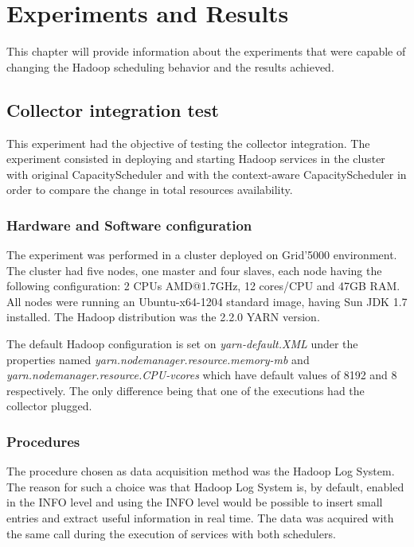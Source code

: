 \chapter{Experiments and Results}
\label{chap:Experiments and Results}
This chapter will provide information about the experiments that were capable of changing the Hadoop scheduling behavior and the results achieved.

\section{Collector integration test}
This experiment had the objective of testing the collector integration. The experiment consisted in deploying and starting Hadoop services in the cluster with original CapacityScheduler and with the context-aware CapacityScheduler in order to compare the change in total resources availability.

\subsection{Hardware and Software configuration}
The experiment was performed in a cluster deployed on Grid'5000 environment. The cluster had five nodes, one master and four slaves, each node having the following configuration: 2 CPUs AMD@1.7GHz, 12 cores/CPU and 47GB RAM. All nodes were running an Ubuntu-x64-1204 standard image, having Sun JDK 1.7 installed. The Hadoop distribution was the 2.2.0 YARN version.

The default Hadoop configuration is set on \textit{yarn-default.XML} under the properties named \textit{yarn.nodemanager.resource.memory-mb} and \textit{yarn.nodemanager.resource.CPU-vcores} which have default values of 8192 and 8 respectively. The only difference being that one of the executions had the collector plugged.

\subsection{Procedures}
The procedure chosen as data acquisition method was the Hadoop Log System. The reason for such a choice was that Hadoop Log System is, by default, enabled in the INFO level and using the INFO level would be possible to insert small entries and extract useful information in real time. The data was acquired with the same call during the execution of services with both schedulers.

